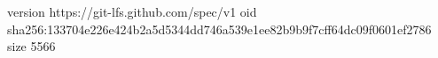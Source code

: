 version https://git-lfs.github.com/spec/v1
oid sha256:133704e226e424b2a5d5344dd746a539e1ee82b9b9f7cff64dc09f0601ef2786
size 5566

